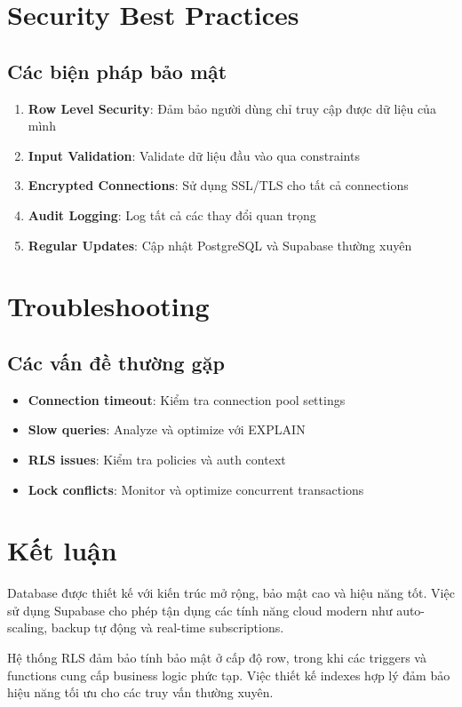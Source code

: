 \documentclass[12pt,a4paper]{article}
\begin{document}
\section{Security Best Practices}

\subsection{Các biện pháp bảo mật}
\begin{enumerate}
    \item \textbf{Row Level Security}: Đảm bảo người dùng chỉ truy cập được dữ liệu của mình
    \item \textbf{Input Validation}: Validate dữ liệu đầu vào qua constraints
    \item \textbf{Encrypted Connections}: Sử dụng SSL/TLS cho tất cả connections
    \item \textbf{Audit Logging}: Log tất cả các thay đổi quan trọng
    \item \textbf{Regular Updates}: Cập nhật PostgreSQL và Supabase thường xuyên
\end{enumerate}

\section{Troubleshooting}

\subsection{Các vấn đề thường gặp}
\begin{itemize}
    \item \textbf{Connection timeout}: Kiểm tra connection pool settings
    \item \textbf{Slow queries}: Analyze và optimize với EXPLAIN
    \item \textbf{RLS issues}: Kiểm tra policies và auth context
    \item \textbf{Lock conflicts}: Monitor và optimize concurrent transactions
\end{itemize}

\section{Kết luận}

Database được thiết kế với kiến trúc mở rộng, bảo mật cao và hiệu năng tốt. Việc sử dụng Supabase cho phép tận dụng các tính năng cloud modern như auto-scaling, backup tự động và real-time subscriptions. 

Hệ thống RLS đảm bảo tính bảo mật ở cấp độ row, trong khi các triggers và functions cung cấp business logic phức tạp. Việc thiết kế indexes hợp lý đảm bảo hiệu năng tối ưu cho các truy vấn thường xuyên.
\end{document}
